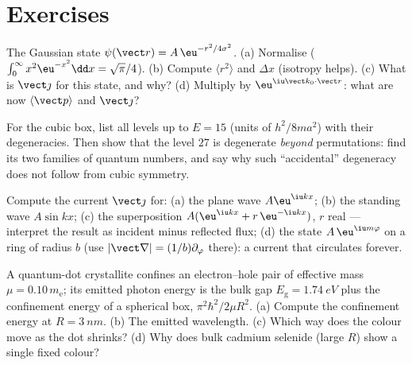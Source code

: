 \section{Exercises}

\begin{exercise}[$\star$]\label{exo:b3:schrodinger-three-dimensions:1}
The Gaussian state $\psi(\vect r) = A\,\eu^{-r^2/4\sigma^2}$. (a)
Normalise ($\int_0^\infty x^2\eu^{-x^2}\dd x = \sqrt\pi/4$). (b)
Compute $\langle r^2\rangle$ and $\Delta x$ (isotropy helps). (c)
What is $\vect\jmath$ for this state, and why? (d) Multiply by
$\eu^{\iu\vect k_0\cdot\vect r}$: what are now $\langle\vect
p\rangle$ and $\vect\jmath$?
\end{exercise}

\begin{exercise}[$\star$]\label{exo:b3:schrodinger-three-dimensions:2}
For the cubic box, list all levels up to $E = 15$ (units of
$h^2/8ma^2$) with their degeneracies. Then show that the level $27$
is degenerate \emph{beyond} permutations: find its two families of
quantum numbers, and say why such ``accidental'' degeneracy does not
follow from cubic symmetry.
\end{exercise}

\begin{exercise}[$\star$]\label{exo:b3:schrodinger-three-dimensions:3}
Compute the current $\vect\jmath$ for: (a) the plane wave
$A\eu^{\iu kx}$; (b) the standing wave $A\sin kx$; (c) the
superposition $A(\eu^{\iu kx} + r\,\eu^{-\iu kx})$, $r$ real ---
interpret the result as incident minus reflected flux; (d) the state
$A\,\eu^{\iu m\varphi}$ on a ring of radius $b$ (use $|\vect\nabla|
= (1/b)\partial_\varphi$ there): a current that circulates forever.
\end{exercise}

\begin{exercise}[$\star$]\label{exo:b3:schrodinger-three-dimensions:4}
A quantum-dot crystallite confines an electron--hole pair of
effective mass $\mu = 0.10\,m_{\text{e}}$; its emitted photon energy
is the bulk gap $E_{\text{g}} = \qty{1.74}{eV}$ plus the confinement
energy of a spherical box, $\pi^2\hbar^2/2\mu R^2$. (a) Compute the
confinement energy at $R = \qty{3}{nm}$. (b) The emitted wavelength.
(c) Which way does the colour move as the dot shrinks? (d) Why does
bulk cadmium selenide (large $R$) show a single fixed colour?
\end{exercise}

